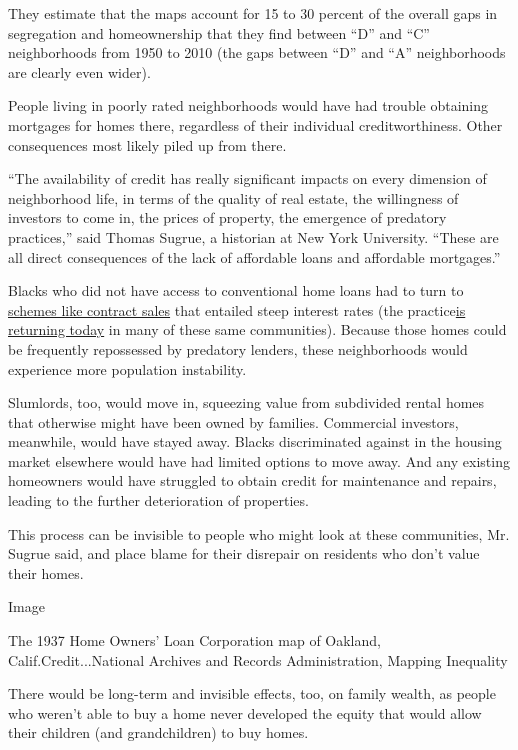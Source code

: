 They estimate that the maps account for 15 to 30 percent of the overall
gaps in segregation and homeownership that they find between ``D'' and
``C'' neighborhoods from 1950 to 2010 (the gaps between ``D'' and ``A''
neighborhoods are clearly even wider).

People living in poorly rated neighborhoods would have had trouble
obtaining mortgages for homes there, regardless of their individual
creditworthiness. Other consequences most likely piled up from there.

``The availability of credit has really significant impacts on every
dimension of neighborhood life, in terms of the quality of real estate,
the willingness of investors to come in, the prices of property, the
emergence of predatory practices,'' said Thomas Sugrue, a historian at
New York University. ``These are all direct consequences of the lack of
affordable loans and affordable mortgages.''

Blacks who did not have access to conventional home loans had to turn to
\href{https://www.theatlantic.com/magazine/archive/2014/06/the-case-for-reparations/361631/}{schemes
like contract sales} that entailed steep interest rates (the
practice\href{https://www.nytimes.com/series/the-housing-trap?action=click\&contentCollection=DealBook\&module=Collection\&region=Marginalia\&src=me\&version=series\&pgtype=article}{is
returning today} in many of these same communities). Because those homes
could be frequently repossessed by predatory lenders, these
neighborhoods would experience more population instability.

Slumlords, too, would move in, squeezing value from subdivided rental
homes that otherwise might have been owned by families. Commercial
investors, meanwhile, would have stayed away. Blacks discriminated
against in the housing market elsewhere would have had limited options
to move away. And any existing homeowners would have struggled to obtain
credit for maintenance and repairs, leading to the further deterioration
of properties.

This process can be invisible to people who might look at these
communities, Mr. Sugrue said, and place blame for their disrepair on
residents who don't value their homes.

Image

The 1937 Home Owners' Loan Corporation map of Oakland,
Calif.Credit...National Archives and Records Administration, Mapping
Inequality

There would be long-term and invisible effects, too, on family wealth,
as people who weren't able to buy a home never developed the equity that
would allow their children (and grandchildren) to buy homes.

